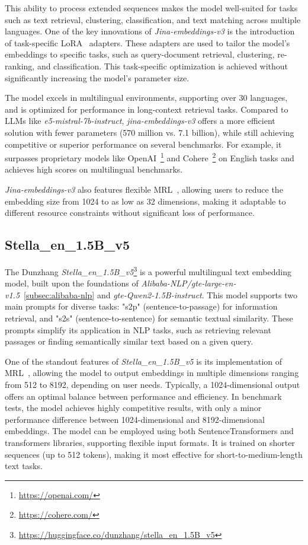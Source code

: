 This ability to process extended sequences makes the model well-suited for tasks such as text retrieval, clustering, classification, and text matching across multiple languages.
One of the key innovations of \textit{Jina-embeddings-v3} is the introduction of task-specific \ac{LoRA}~\cite{hu2022lora} adapters.
These adapters are used to tailor the model's embeddings to specific tasks, such as query-document retrieval, clustering, re-ranking, and classification.
This task-specific optimization is achieved without significantly increasing the model's parameter size.

The model excels in multilingual environments, supporting over 30 languages, and is optimized for performance in long-context retrieval tasks.
Compared to LLMs like \textit{e5-mistral-7b-instruct}, \textit{jina-embeddings-v3} offers a more efficient solution with fewer parameters (570 million vs. 7.1 billion), while still achieving competitive or superior performance on several benchmarks.
For example, it surpasses proprietary models like OpenAI~\footnote{\url{https://openai.com/}} and Cohere~\footnote{\url{https://cohere.com/}} on English tasks and achieves high scores on multilingual benchmarks.

\textit{Jina-embeddings-v3} also features flexible \ac{MRL}~\cite{kusupati2024matryoshkarepresentationlearning}, allowing users to reduce the embedding size from 1024 to as low as 32 dimensions, making it adaptable to different resource constraints without significant loss of performance.

\subsection{Stella\_en\_1.5B\_v5}\label{subsec:dunzhang}
The Dunzhang \textit{Stella\_en\_1.5B\_v5}\footnote{\url{https://huggingface.co/dunzhang/stella_en_1.5B_v5}} is a powerful multilingual text embedding model, built upon the foundations of \textit{Alibaba-NLP/gte-large-en-v1.5}~\ref{subsec:alibaba-nlp} and \textit{gte-Qwen2-1.5B-instruct}.
This model supports two main prompts for diverse tasks: "s2p" (sentence-to-passage) for information retrieval, and "s2s" (sentence-to-sentence) for semantic textual similarity. 
These prompts simplify its application in NLP tasks, such as retrieving relevant passages or finding semantically similar text based on a given query.

One of the standout features of \textit{Stella\_en\_1.5B\_v5} is its implementation of \ac{MRL}~\cite{kusupati2024matryoshkarepresentationlearning}, allowing the model to output embeddings in multiple dimensions ranging from 512 to 8192, depending on user needs. 
Typically, a 1024-dimensional output offers an optimal balance between performance and efficiency. 
In benchmark tests, the model achieves highly competitive results, with only a minor performance difference between 1024-dimensional and 8192-dimensional embeddings.
The model can be employed using both SentenceTransformers and transformers libraries, supporting flexible input formats. 
It is trained on shorter sequences (up to 512 tokens), making it most effective for short-to-medium-length text tasks. 

